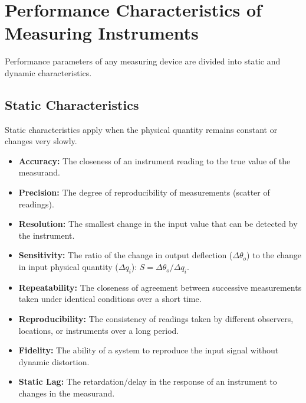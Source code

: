 \documentclass[12pt,a4paper]{article}
\begin{document}
\section{Performance Characteristics of Measuring Instruments}

Performance parameters of any measuring device are divided into static and dynamic characteristics.

\subsection{Static Characteristics}
Static characteristics apply when the physical quantity remains constant or changes very slowly.

\begin{tcolorbox}[defbox, title={\textbf{Key Static Characteristics}}]
\begin{itemize}[leftmargin=*, itemsep=3.5pt, topsep=0pt]
  \item \textbf{Accuracy:} The closeness of an instrument reading to the true value of the measurand.
  \item \textbf{Precision:} The degree of reproducibility of measurements (scatter of readings).
  \item \textbf{Resolution:} The smallest change in the input value that can be detected by the instrument.
  \item \textbf{Sensitivity:} The ratio of the change in output deflection ($\Delta \theta_o$) to the change in input physical quantity ($\Delta q_i$): $S = \Delta \theta_o / \Delta q_i$.
  \item \textbf{Repeatability:} The closeness of agreement between successive measurements taken under identical conditions over a short time.
  \item \textbf{Reproducibility:} The consistency of readings taken by different observers, locations, or instruments over a long period.
  \item \textbf{Fidelity:} The ability of a system to reproduce the input signal without dynamic distortion.
  \item \textbf{Static Lag:} The retardation/delay in the response of an instrument to changes in the measurand.
\end{itemize}
\end{tcolorbox}
\end{document}
